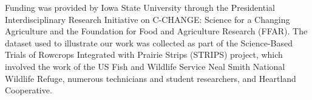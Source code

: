 
Funding was provided by Iowa State University through the Presidential
Interdisciplinary Research Initiative on C-CHANGE: Science for a
Changing Agriculture and the Foundation for Food and Agriculture
Research (FFAR). The dataset used to illustrate our work was collected
as part of the Science-Based Trials of Rowcrops Integrated with
Prairie Strips (STRIPS) project, which involved the work of the US Fish
and Wildlife Service Neal Smith National Wildlife Refuge, numerous
technicians and student researchers, and Heartland Cooperative.

